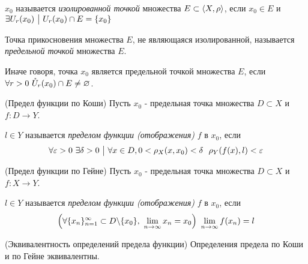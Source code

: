 \begin{definition}
	$x_0$ называется \textit{изолированной точкой} множества $E \subset \left\langle X, \rho\right\rangle$, если $x_0 \in E$ и $\exists U_r(x_0) \ \big|\  U_r(x_0) \cap E = \{x_0\}$
\end{definition}

\begin{definition}
	Точка прикосновения множества $E$, не являющаяся изолированной, называется \textit{предельной точкой} множества $E$.
\end{definition}

\begin{note}
	Иначе говоря, точка $x_0$ является предельной точкой множества $E$, если \\ \(\forall r > 0\ \mathring{U}_r(x_0) \cap E \neq \varnothing\).
\end{note}

\begin{definition} (Предел функции по Коши)
	Пусть $x_0$ - предельная точка множества $D \subset X$ и $f: D \to Y$.
	
	$l \in Y$ называется \textit{пределом функции (отображения)} $f$ в $x_0$, если
	\[
		\forall \eps > 0\ \exists \delta > 0 \such \forall x \in D, 0 < \rho_X(x, x_0) < \delta\ \ \rho_Y(f(x), l) < \eps
	\]
\end{definition}

\begin{definition} (Предел функции по Гейне)
	Пусть $x_0$ - предельная точка множества $D \subset X$ и $f: X \to Y$.
	
	$l \in Y$ называется \textit{пределом функции (отображения)} $f$ в $x_0$, если
	\[
		\left(\forall \{x_n\}_{n = 1}^\infty \subset D \backslash \{x_0\},\ \lim\limits_{n \to \infty} x_n = x_0\right)\ \lim\limits_{n \to \infty} f(x_n) = l
	\]
\end{definition}

\begin{theorem} (Эквивалентность определений предела функции)
	Определения предела по Коши и по Гейне эквивалентны.
\end{theorem}

